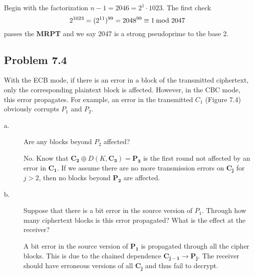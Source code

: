 \documentclass[../hw_sols.tex]{subfiles}
\begin{document}
\begin{solution}
Begin with the factorization $n - 1 = 2046 = 2^1 \cdot 1023$. The first check 
	\[ 2^{1023} = (2^{11})^{99} = 2048^{99} \equiv 1 \tmod{2047} \]
passes the \textbf{MRPT} and we say 2047 is a strong pseudoprime to the 
base 2.
\end{solution}


\newpage



\subsection*{Problem 7.4}

With the ECB mode, if there is an error in a block of the transmitted 
ciphertext, only the corresponding plaintext block is affected. However, in 
the CBC mode, this error propagates. For example, an error in the transmitted 
$C_1$ (Figure 7.4) obviously corrupts $P_1$ and $P_2$.

\begin{description}

\item[a.] Are any blocks beyond $P_2$ affected?

\begin{solution}
No. Know that 
$\mathbf{C_2} \oplus D(K, \mathbf{C_3}) = \mathbf{P_3}$	
is the first round not affected by an error in $\mathbf{C_1}$. If we assume 
there are no more transmission errors on $\mathbf{C_j}$ for $j > 2$, then no 
blocks beyond $\mathbf{P_2}$ are affected.
\end{solution}

\item[b.] Suppose that there is a bit error in the source version of $P_1$. 
Through how many ciphertext blocks is this error propagated? What is the 
effect at the receiver?

\begin{solution}
A bit error in the source version of $\mathbf{P_1}$ is propagated through all 
the cipher blocks. This is due to the chained dependence 
$\mathbf{C_{j-1}} \to \mathbf{P_j}$. The receiver should have erroneous 
versions of all $\mathbf{C_j}$ and thus fail to decrypt.
\end{solution}

\end{description}
\end{document}
